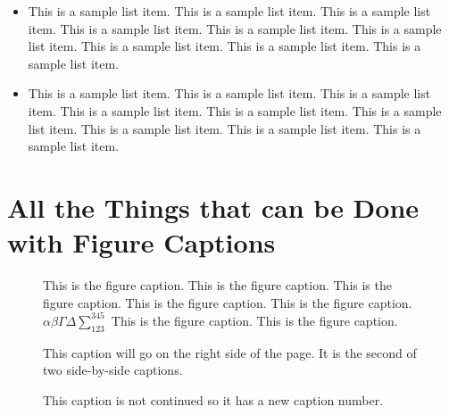 
\begin{itemize}
\item
This is a sample list item. This is a sample list item.
This is a sample list item. This is a sample list item.
This is a sample list item. This is a sample list item.
This is a sample list item. This is a sample list item.
This is a sample list item.

\item
This is a sample list item. This is a sample list item.
This is a sample list item. This is a sample list item.
This is a sample list item. This is a sample list item.
This is a sample list item. This is a sample list item.
This is a sample list item.
\end{itemize}

\section {All the Things that can be Done with Figure Captions}

\begin{figure}[h]
\caption{This is the figure caption.
This is the figure caption. This is the figure caption.
This is the figure caption. This is the figure caption. 
$\alpha\beta\Gamma\Delta\sum_{123}^{345}$
This is the figure caption. This is the figure caption.\label{Firstfig}}
\end{figure}

\begin{figure}[h]
{This caption will go on the right side of
the page. It is the second of two side-by-side captions.}
\end{figure}

\begin{figure}[h]
\end{figure}

\begin{figure}[h]
\end{figure}


\begin{figure}[h]
\caption{This caption is not continued so it has a new caption number.
\label{secondfig}}
\end{figure}


